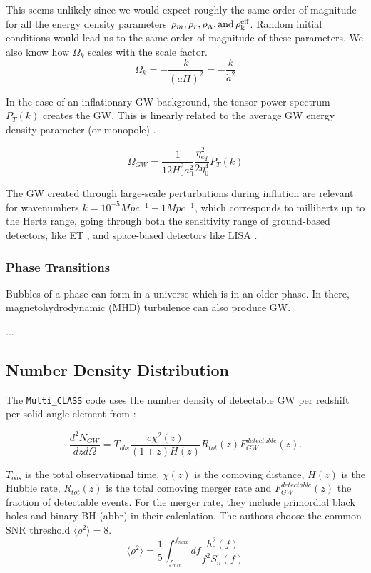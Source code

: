 This seems unlikely since we would expect roughly the same order of magnitude for all the energy density parameters $\rho_m, \rho_r, \rho_\Lambda, \rm{ and } \, \rho_k^{eff}$. Random initial conditions would lead us to the same order of magnitude of these parameters.
We also know how $\Omega_k$ scales with the scale factor.
\begin{equation}
    \Omega_k = - \frac{k}{(aH)^2}= -\frac{k}{\dot{a}^2}
\end{equation}

In the case of an inflationary GW background, the tensor power spectrum $P_T(k)$ creates the GW. This is linearly related to the average GW energy density parameter (or monopole) \cite{schulze_gw_class_2023}.

\begin{equation}
    \bar{\Omega}_{GW} = \frac{1}{12 H_0^2 a_0^2} \frac{\eta_{eq}^2}{2\eta_0^4} P_T(k)
\end{equation}

The GW created through large-scale perturbations during inflation are relevant for wavenumbers $k=10^{-5} Mpc^{-1} -1 Mpc^{-1}$, which corresponds to millihertz up to the Hertz range, going through both the sensitivity range of ground-based detectors, like ET \cite{alonso_noise_2020}, and space-based detectors like LISA \cite{robson_construction_2019}.

\subsubsection{Phase Transitions}

Bubbles of a phase can form in a universe which is in an older phase. In there, magnetohydrodynamic (MHD) turbulence can also produce GW.

...

\subsection{Number Density Distribution}

The {\tt Multi\_CLASS} code uses the number density of detectable GW per redshift per solid angle element from \cite{scelfo_gwtimeslss_2018}:

\begin{equation}
    \frac{d^2N_{GW}}{dzd\Omega} = T_{obs}\frac{c\chi^2(z)}{(1+z)H(z)}R_{tot}(z)F_{GW}^{detectable}(z).
\end{equation}

$T_{obs}$ is the total observational time, $\chi(z)$ is the comoving distance, $H(z)$ is the Hubble rate, $R_{tot}(z)$ is the total comoving merger rate and $F_{GW}^{detectable}(z)$ the fraction of detectable events. For the merger rate, they include primordial black holes and binary BH (abbr) in their calculation.
The authors choose the common SNR threshold $\langle \rho^2 \rangle =8$.
\begin{equation}
    \langle \rho^2 \rangle = \frac{1}{5}\int_{f_{min}}^{f_{max}} df \frac{h_c^2(f)}{f^2 S_n(f)}
\end{equation}

